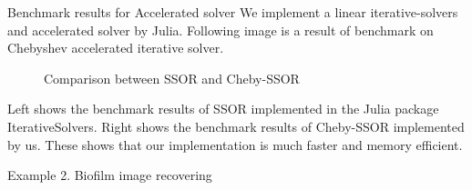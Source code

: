 \documentclass[10pt]{beamer}
\begin{document}
\begin{frame}{Benchmark results for Accelerated solver}
We implement a linear iterative-solvers and accelerated solver by Julia. 
Following image is a result of benchmark on Chebyshev accelerated iterative solver.
\begin{figure} 
    \caption{Comparison between SSOR and Cheby-SSOR}
\end{figure}

Left shows the benchmark results of SSOR implemented in the Julia package
IterativeSolvers. Right shows the benchmark results of Cheby-SSOR implemented by us.
These shows that our implementation is much faster and memory efficient.
\end{frame}

\begin{frame}{Example 2. Biofilm image recovering}
    
\end{frame}
\end{document}
